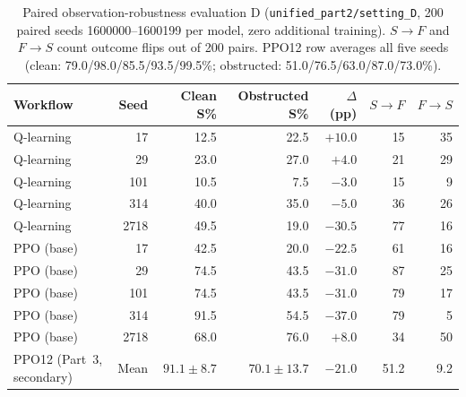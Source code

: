\begin{table}[H]
\centering\small
\begin{tabular}{@{}lrrrrrr@{}}
\toprule
Workflow & Seed & Clean S\% & Obstructed S\% & $\Delta$ (pp) & $S\to F$ & $F\to S$ \\
\midrule
Q-learning & 17   & 12.5 & 22.5 & $+10.0$ & 15 & 35 \\
Q-learning & 29   & 23.0 & 27.0 & $+4.0$  & 21 & 29 \\
Q-learning & 101  & 10.5 &  7.5 & $-3.0$  & 15 &  9 \\
Q-learning & 314  & 40.0 & 35.0 & $-5.0$  & 36 & 26 \\
Q-learning & 2718 & 49.5 & 19.0 & $-30.5$ & 77 & 16 \\
\addlinespace[2pt]
PPO (base) & 17   & 42.5 & 20.0 & $-22.5$ & 61 & 16 \\
PPO (base) & 29   & 74.5 & 43.5 & $-31.0$ & 87 & 25 \\
PPO (base) & 101  & 74.5 & 43.5 & $-31.0$ & 79 & 17 \\
PPO (base) & 314  & 91.5 & 54.5 & $-37.0$ & 79 &  5 \\
PPO (base) & 2718 & 68.0 & 76.0 & $+8.0$  & 34 & 50 \\
\addlinespace[2pt]
PPO12 (Part~3, secondary) & Mean & $91.1\pm 8.7$ & $70.1\pm 13.7$ & $-21.0$ & 51.2 & 9.2 \\
\bottomrule
\end{tabular}
\caption{Paired observation-robustness evaluation D (\texttt{unified\_part2/setting\_D}, 200 paired seeds 1600000--1600199 per model, zero additional training). $S\to F$ and $F\to S$ count outcome flips out of 200 pairs. PPO12 row averages all five seeds (clean: 79.0/98.0/85.5/93.5/99.5\%; obstructed: 51.0/76.5/63.0/87.0/73.0\%).}
\label{tab:robustness-pairs}
\end{table}

